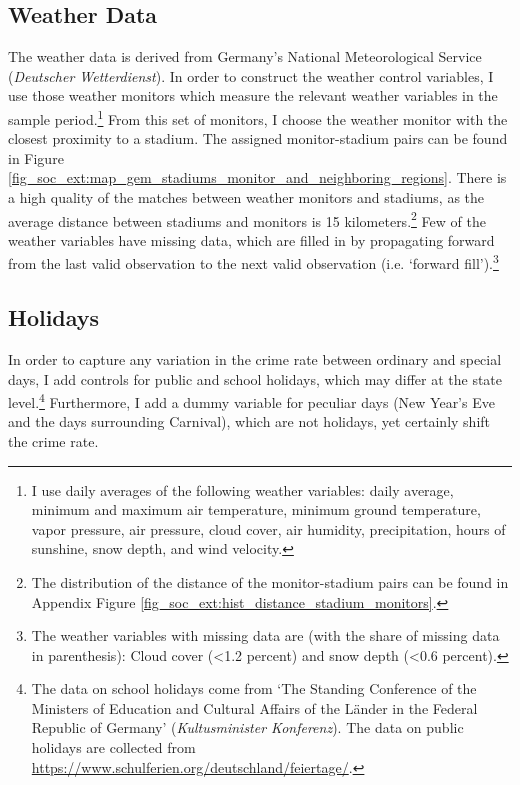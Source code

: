\subsection{Weather Data}
The weather data is derived from Germany's National Meteorological Service (\textit{Deutscher Wetterdienst}). In order to construct the weather control variables, I use those weather monitors which measure the relevant weather variables in the sample period.\footnote{I use daily averages of the following weather variables: daily average, minimum and maximum air temperature, minimum ground temperature, vapor pressure, air pressure, cloud cover, air humidity, precipitation, hours of sunshine, snow depth, and wind velocity.} From this set of monitors, I choose the weather monitor with the closest proximity to a stadium. The assigned monitor-stadium pairs can be found in Figure \ref{fig_soc_ext:map_gem_stadiums_monitor_and_neighboring_regions}. There is a high quality of the matches between weather monitors and stadiums, as the average distance between stadiums and monitors is 15 kilometers.\footnote{The distribution of the distance of the monitor-stadium pairs can be found in Appendix Figure \ref{fig_soc_ext:hist_distance_stadium_monitors}.} Few of the weather variables have missing data, which are filled in by propagating forward from the last valid observation to the next valid observation (i.e. `forward fill').\footnote{The weather variables with missing data are (with the share of missing data in parenthesis): Cloud cover (<1.2 percent) and snow depth (<0.6 percent).}



\subsection{Holidays}
In order to capture any variation in the crime rate between ordinary and special days, I add controls for public and school holidays, which may differ at the state level.\footnote{The data on school holidays come from `The Standing Conference of the Ministers of Education and Cultural Affairs of the Länder in the Federal Republic of Germany' (\textit{Kultusminister Konferenz}). The data on public holidays are collected from \href{https://www.schulferien.org/deutschland/feiertage/}{https://www.schulferien.org/deutschland/feiertage/}.} Furthermore, I add a dummy variable for peculiar days (New Year's Eve and the days surrounding Carnival), which are not holidays, yet certainly shift the crime rate.



